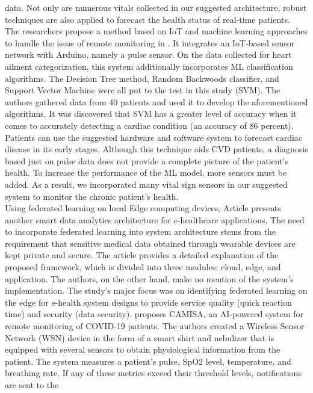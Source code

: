 \documentclass{bmcart}
\begin{document}
data. Not only are numerous vitals collected in our suggested architecture,
robust techniques are also applied to forecast the health status of real-time
patients.\\
The researchers propose a method based on IoT and machine learning approaches to
handle the issue of remote monitoring in \cite{9167660}. It integrates an
IoT-based sensor network with Arduino, namely a pulse sensor. On the data
collected for heart ailment categorization, this system additionally
incorporates ML classification algorithms. The Decision Tree method, Random
Backwoods classifier, and Support Vector Machine were all put to the test in
this study (SVM). The authors gathered data from 40 patients and used it to
develop the aforementioned algorithms. It was discovered that SVM has a greater
level of accuracy when it comes to accurately detecting a cardiac condition (an
accuracy of 86 percent). Patients can use the suggested hardware and software
system to forecast cardiac disease in its early stages. Although this technique
aids CVD patients, a diagnosis based just on pulse data does not provide a
complete picture of the patient's health. To increase the performance of the ML
model, more sensors must be added. As a result, we incorporated many vital sign
sensors in our suggested system to monitor the chronic patient's health.\\
Using federated learning on local Edge computing devices, Article \cite{9377873}
presents another smart data analytics architecture for e-healthcare
applications. The need to incorporate federated learning into system
architecture stems from the requirement that sensitive medical data obtained
through wearable devices are kept private and secure. The article provides a
detailed explanation of the proposed framework, which is divided into three
modules: cloud, edge, and application. The authors, on the other hand, make no
mention of the system's implementation. The study's major focus was on
identifying federated learning on the edge for e-health system designs to
provide service quality (quick reaction time) and security (data
security).\cite{gbha} proposes CAMISA, an AI-powered system for remote
monitoring of COVID-19 patients. The authors created a Wireless Sensor Network
(WSN) device in the form of a smart shirt and nebulizer that is equipped with
several sensors to obtain physiological information from the patient. The system
measures a patient's pulse, SpO2 level, temperature, and breathing rate. If any
of these metrics exceed their threshold levels, notifications are sent to the
\end{document}
